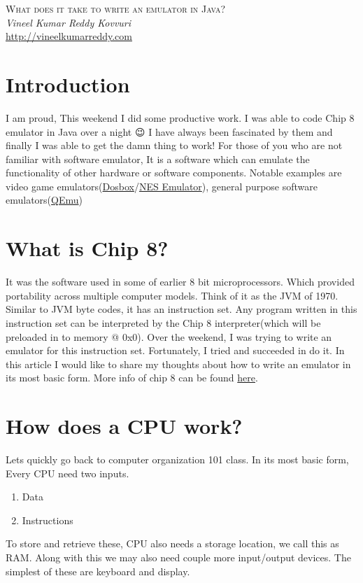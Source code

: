 \documentclass{article}
\begin{document}
\begin{titlepage}
   \begin{center}
      \Large\textsc{What does it take to write an emulator in Java?}\\
      \vspace{5mm}
      \Large\textit{Vineel Kumar Reddy Kovvuri}\\
      \url{http://vineelkumarreddy.com}\\
   \end{center}
\end{titlepage}

\tableofcontents

\newpage
\section{Introduction}
I am proud, This weekend I did some productive work. I was able to code Chip 8 emulator in Java over a night 😉 I have always been fascinated by them and finally I was able to get the damn thing to work! For those of you who are not familiar with software emulator, It is a software which can emulate the functionality of other hardware or software components. Notable examples are video game emulators(\href{https://en.wikipedia.org/wiki/DOSBox}{Dosbox}/\href{https://en.wikipedia.org/wiki/List_of_video_game_emulators}{NES Emulator}), general purpose software emulators(\href{https://en.wikipedia.org/wiki/QEMU}{QEmu})

\section{What is Chip 8?}
It was the software used in some of earlier 8 bit microprocessors. Which provided portability across multiple computer models. Think of it as the JVM of 1970. Similar to JVM byte codes, it has an instruction set. Any program written in this instruction set can be interpreted by the Chip 8 interpreter(which will be preloaded in to memory @ 0x0). Over the weekend, I was trying to write an emulator for this instruction set. Fortunately, I tried and succeeded in do it. In this article I would like to share my thoughts about how to write an emulator in its most basic form. More info of chip 8 can be found \href{https://en.wikipedia.org/wiki/CHIP-8}{here}.

\section{How does a CPU work?}
Lets quickly go back to computer organization 101 class. In its most basic form, Every CPU need two inputs.
\begin{enumerate}[noitemsep]
\item Data
\item Instructions
\end{enumerate}
To store and retrieve these, CPU also needs a storage location, we call this as RAM.  Along with this we may also need couple more input/output devices. The simplest of these are keyboard and display.
\end{document}
